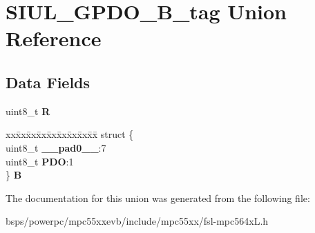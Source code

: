 \hypertarget{unionSIUL__GPDO__8B__tag}{}\section{S\+I\+U\+L\+\_\+\+G\+P\+D\+O\+\_\+B\+\_\+tag Union Reference}
\label{unionSIUL__GPDO__8B__tag}
\subsection*{Data Fields}
\begin{DoxyCompactItemize}
\item 
\mbox{\label{unionSIUL__GPDO__8B__tag_af73578f168586fc0fe675265ea357ba7}} 
uint8\+\_\+t {\bfseries R}
\item 
\mbox{\label{unionSIUL__GPDO__8B__tag_a4fe4c891bf874d513acf49d8d07495bc}} 
\begin{tabbing}
xx\=xx\=xx\=xx\=xx\=xx\=xx\=xx\=xx\=\kill
struct \{\\
\>uint8\_t {\bfseries \_\_pad0\_\_}:7\\
\>uint8\_t {\bfseries PDO}:1\\
\} {\bfseries B}\\

\end{tabbing}\end{DoxyCompactItemize}


The documentation for this union was generated from the following file\+:\begin{DoxyCompactItemize}
\item 
bsps/powerpc/mpc55xxevb/include/mpc55xx/fsl-\/mpc564x\+L.\+h\end{DoxyCompactItemize}
